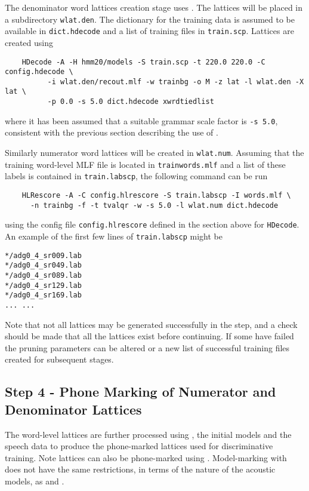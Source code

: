 The denominator word lattices creation stage uses . The
lattices will be placed in a subdirectory \texttt{wlat.den}. The dictionary
for the training data is assumed to be available in \texttt{dict.hdecode} and a list of
training files in \texttt{train.scp}. Lattices are created using
\begin{verbatim}
    HDecode -A -H hmm20/models -S train.scp -t 220.0 220.0 -C config.hdecode \ 
          -i wlat.den/recout.mlf -w trainbg -o M -z lat -l wlat.den -X lat \
          -p 0.0 -s 5.0 dict.hdecode xwrdtiedlist
\end{verbatim}
where it has been assumed that a suitable grammar scale factor is \texttt{-s
  5.0}, consistent with the previous section describing the use of
\htool{HDecode}.

Similarly numerator word lattices will be created in \texttt{wlat.num}. Assuming that the training word-level
MLF file is located in \texttt{trainwords.mlf} and a list of these labels is
contained in \texttt{train.labscp}, the following command can be run
\begin{verbatim}
    HLRescore -A -C config.hlrescore -S train.labscp -I words.mlf \
      -n trainbg -f -t tvalqr -w -s 5.0 -l wlat.num dict.hdecode 
\end{verbatim}
using the config file \texttt{config.hlrescore} defined in the section above
for \texttt{HDecode}. An example of the first few lines of \texttt{train.labscp} might be
\begin{verbatim}
*/adg0_4_sr009.lab
*/adg0_4_sr049.lab
*/adg0_4_sr089.lab
*/adg0_4_sr129.lab
*/adg0_4_sr169.lab
... ...

\end{verbatim}
Note that not all lattices may be generated successfully in the  step, and a check should be
made that all the lattices exist before continuing. If some have failed the pruning parameters can be 
altered or a new list of successful training files created for subsequent stages.

\subsection{Step 4 - Phone Marking of Numerator and Denominator
  Lattices}

The word-level lattices are further processed using , the
initial models and the speech data to produce the phone-marked lattices used
for discriminative training. Note lattices can also be phone-marked using
\htool{HVite}. Model-marking with \htool{HVite} does not have the same
restrictions, in terms of the nature of the acoustic models, as
\htool{HDecode} and \htool{HDecode.mod}.

